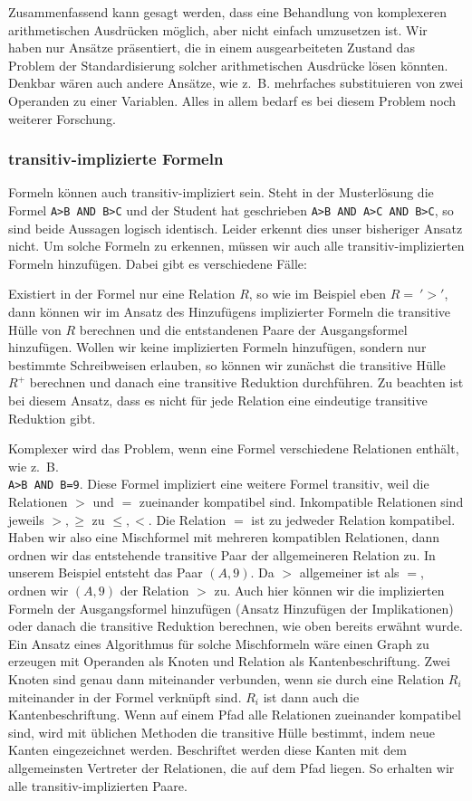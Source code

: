 Zusammenfassend kann gesagt werden, dass eine Behandlung von komplexeren arithmetischen Ausdrücken möglich, aber nicht einfach umzusetzen ist. Wir haben nur Ansätze präsentiert, die in einem ausgearbeiteten Zustand das Problem der Standardisierung solcher arithmetischen Ausdrücke lösen könnten. Denkbar wären auch andere Ansätze, wie \mbox{z. B.} mehrfaches substituieren von zwei Operanden zu einer Variablen.  Alles in allem bedarf es bei diesem Problem noch weiterer Forschung.


\subsubsection{transitiv-implizierte Formeln}

Formeln können auch transitiv-impliziert sein. Steht in der Musterlösung die Formel \verb|A>B AND B>C| und der Student hat geschrieben \verb|A>B AND A>C AND B>C|, so sind beide Aussagen logisch identisch. Leider erkennt dies unser bisheriger Ansatz nicht. Um solche Formeln zu erkennen, müssen wir auch alle transitiv-implizierten Formeln hinzufügen. Dabei gibt es verschiedene Fälle: 

Existiert in der Formel nur eine Relation $R$, so wie im Beispiel eben $R=\ '>'$, dann können wir im Ansatz des Hinzufügens implizierter Formeln die transitive Hülle von $R$ berechnen und die entstandenen Paare der Ausgangsformel hinzufügen. Wollen wir keine implizierten Formeln hinzufügen, sondern nur bestimmte Schreibweisen erlauben, so können wir zunächst die transitive Hülle $R^+$ berechnen und danach eine transitive Reduktion durchführen. Zu beachten ist bei diesem Ansatz, dass es nicht für jede Relation eine eindeutige transitive Reduktion gibt. 

Komplexer wird das Problem, wenn eine Formel verschiedene Relationen enthält, wie \mbox{z. B.} \\\verb|A>B AND B=9|. Diese Formel impliziert eine weitere Formel transitiv, weil die Relationen $>$ und $=$ zueinander kompatibel sind. Inkompatible Relationen sind jeweils $>,\geq$ zu $\leq,<$. Die Relation $=$ ist zu jedweder Relation kompatibel. Haben wir also eine Mischformel mit mehreren kompatiblen Relationen, dann ordnen wir das entstehende transitive Paar der allgemeineren Relation zu. In unserem Beispiel entsteht das Paar $(A,9)$. Da $>$ allgemeiner ist als $=$, ordnen wir $(A,9)$ der Relation $>$ zu. Auch hier können wir die implizierten Formeln der Ausgangsformel hinzufügen (Ansatz Hinzufügen der Implikationen) oder danach die transitive Reduktion berechnen, wie oben bereits erwähnt wurde. Ein Ansatz eines Algorithmus für solche Mischformeln wäre einen Graph zu erzeugen mit Operanden als Knoten und Relation als Kantenbeschriftung. Zwei Knoten sind genau dann miteinander verbunden, wenn sie durch eine Relation $R_i$ miteinander in der Formel verknüpft sind. $R_i$ ist dann auch die Kantenbeschriftung. Wenn auf einem Pfad alle Relationen zueinander kompatibel sind, wird mit üblichen Methoden die transitive Hülle bestimmt, indem neue Kanten eingezeichnet werden. Beschriftet werden diese Kanten mit dem allgemeinsten Vertreter der Relationen, die auf dem Pfad liegen. So erhalten wir alle transitiv-implizierten Paare.

